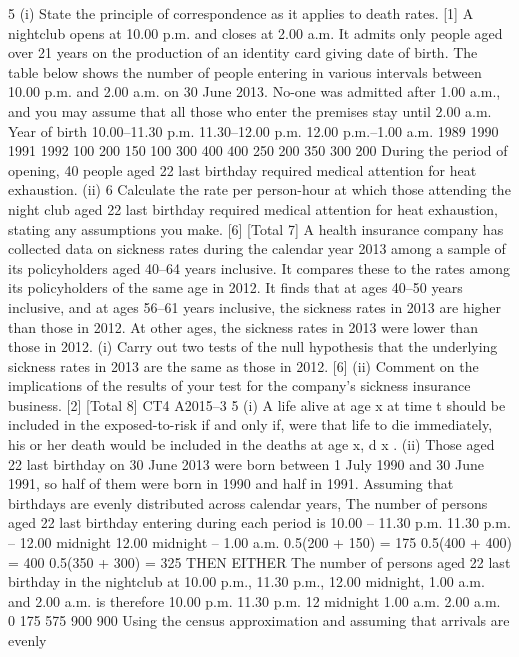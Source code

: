 \documentclass[a4paper,12pt]{article}
\begin{document}
\begin{enumerate}
5
(i)
State the principle of correspondence as it applies to death rates.
[1]
A nightclub opens at 10.00 p.m. and closes at 2.00 a.m. It admits only people aged
over 21 years on the production of an identity card giving date of birth.
The table below shows the number of people entering in various intervals between
10.00 p.m. and 2.00 a.m. on 30 June 2013. No-one was admitted after 1.00 a.m., and
you may assume that all those who enter the premises stay until 2.00 a.m.
Year of
birth 10.00–11.30
p.m. 11.30–12.00
p.m. 12.00 p.m.–1.00 a.m.
1989
1990
1991
1992 100
200
150
100 300
400
400
250 200
350
300
200
During the period of opening, 40 people aged 22 last birthday required medical
attention for heat exhaustion.
(ii)
6
Calculate the rate per person-hour at which those attending the night club aged
22 last birthday required medical attention for heat exhaustion, stating any
assumptions you make.
[6]
[Total 7]
A health insurance company has collected data on sickness rates during the calendar
year 2013 among a sample of its policyholders aged 40–64 years inclusive. It
compares these to the rates among its policyholders of the same age in 2012. It finds
that at ages 40–50 years inclusive, and at ages 56–61 years inclusive, the sickness
rates in 2013 are higher than those in 2012. At other ages, the sickness rates in 2013
were lower than those in 2012.
(i) Carry out two tests of the null hypothesis that the underlying sickness rates in
2013 are the same as those in 2012.
[6]
(ii) Comment on the implications of the results of your test for the company’s
sickness insurance business.
[2]
[Total 8]
CT4 A2015–3
5
(i) A life alive at age x at time t should be included in the
exposed-to-risk if and only if, were that life to die immediately,
his or her death would be included in the deaths at age x, d x .
(ii) Those aged 22 last birthday on 30 June 2013 were born between 1 July 1990
and 30 June 1991, so half of them were born in 1990 and half in 1991.
Assuming that birthdays are evenly distributed across calendar years,
The number of persons aged 22 last birthday entering during each period is
10.00 – 11.30 p.m.
11.30 p.m. – 12.00 midnight
12.00 midnight – 1.00 a.m.
0.5(200 + 150) = 175
0.5(400 + 400) = 400
0.5(350 + 300) = 325
THEN EITHER
The number of persons aged 22 last birthday in the nightclub at 10.00 p.m.,
11.30 p.m., 12.00 midnight, 1.00 a.m. and 2.00 a.m. is therefore
10.00 p.m.
11.30 p.m.
12 midnight
1.00 a.m.
2.00 a.m.
0
175
575
900
900
Using the census approximation and assuming that arrivals are evenly

\end{enumerate}
\end{document}
